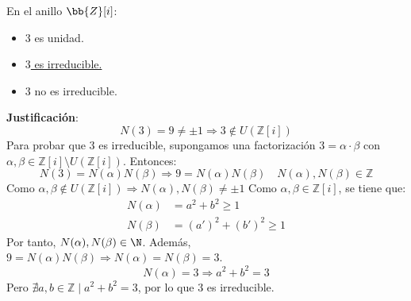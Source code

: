 \begin{ejercicio}
    En el anillo $\bb{Z}[i]$:
    \begin{itemize}
        \item $3$ es unidad.
        \item \underline{$3$ es irreducible.}
        \item $3$ no es irreducible.
    \end{itemize}

    \noindent
    \textbf{Justificación}:
    \begin{equation*}
        N(3) = 9 \neq \pm 1 \Longrightarrow 3 \notin U(\mathbb{Z}[i])
    \end{equation*}
    Para probar que $3$ es irreducible, supongamos una factorización $3=\alpha \cdot \beta$ con $\alpha, \beta \in \mathbb{Z}[i]\setminus U(\mathbb{Z}[i])$. Entonces:
    \begin{equation*}
        N(3) = N(\alpha)N(\beta) \Longrightarrow 9 = N(\alpha)N(\beta) \quad N(\alpha), N(\beta) \in \mathbb{Z}
    \end{equation*}
    Como $\alpha, \beta \notin U(\mathbb{Z}[i]) \Longrightarrow N(\alpha), N(\beta)\neq \pm 1$
    Como $\alpha, \beta \in \mathbb{Z}[i]$, se tiene que:
    \begin{align*}
        N(\alpha) &= a^2 + b^2 \geq 1 \\
        N(\beta) &= {(a')}^{2} + {(b')}^{2} \geq 1
    \end{align*}
    Por tanto, $N(\alpha), N(\beta) \in \N$. Además, $9=N(\alpha)N(\beta)\Longrightarrow N(\alpha)=N(\beta)=3$.
    \begin{equation*}
        N(\alpha) = 3 \Longrightarrow a^2 + b^2 = 3
    \end{equation*}
    Pero $\nexists a,b \in \mathbb{Z} \mid a^2 + b^2 = 3$, por lo que 3 es irreducible.
\end{ejercicio}

